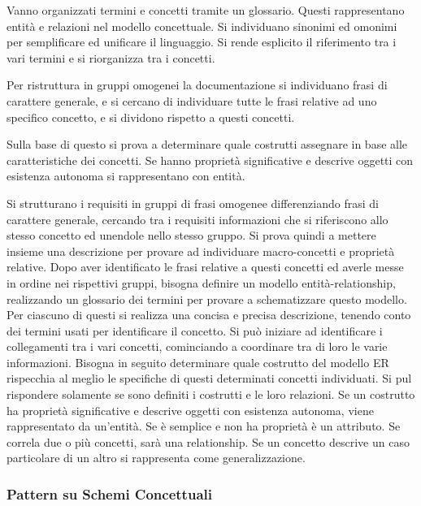 \documentclass{article}
\numberwithin{equation}{subsection}
\begin{document}
Vanno organizzati termini e concetti tramite un glossario. Questi rappresentano entità e relazioni nel modello concettuale. Si individuano sinonimi ed omonimi per semplificare ed unificare il 
linguaggio. Si rende esplicito il riferimento tra i vari termini e si riorganizza tra i concetti. 

Per ristruttura in gruppi omogenei la documentazione si individuano frasi di carattere generale, e si cercano di individuare tutte le frasi relative ad uno specifico 
concetto, e si dividono rispetto a questi concetti. 

Sulla base di questo si prova a determinare quale costrutti assegnare in base alle caratteristiche dei concetti. Se hanno proprietà significative e 
descrive oggetti con esistenza autonoma si rappresentano con entità. 

Si strutturano i requisiti in gruppi di frasi omogenee differenziando frasi di carattere generale, cercando tra i requisiti informazioni che si riferiscono allo stesso concetto ed unendole nello stesso gruppo. Si prova 
quindi a mettere insieme una descrizione per provare ad individuare macro-concetti e proprietà relative. Dopo aver identificato le frasi relative a questi concetti ed averle messe in ordine nei rispettivi 
gruppi, bisogna definire un modello entità-relationship, realizzando un glossario dei termini per provare a schematizzare questo modello. Per ciascuno di questi si realizza una concisa e precisa descrizione, 
tenendo conto dei termini usati per identificare il concetto. Si può iniziare ad identificare i collegamenti tra i vari concetti, cominciando a coordinare tra di loro le varie informazioni. 
Bisogna in seguito determinare quale costrutto del modello ER rispecchia al meglio le specifiche di questi determinati concetti individuati. Si pul rispondere solamente se sono definiti i costrutti e le loro 
relazioni. 
Se un costrutto ha proprietà significative e descrive oggetti con esistenza autonoma, viene rappresentato da un'entità. Se è semplice e non ha proprietà è un attributo. Se correla due o più concetti, sarà una 
relationship. Se un concetto descrive un caso particolare di un altro si rappresenta come generalizzazione. 

\subsubsection{Pattern su Schemi Concettuali}
\end{document}
